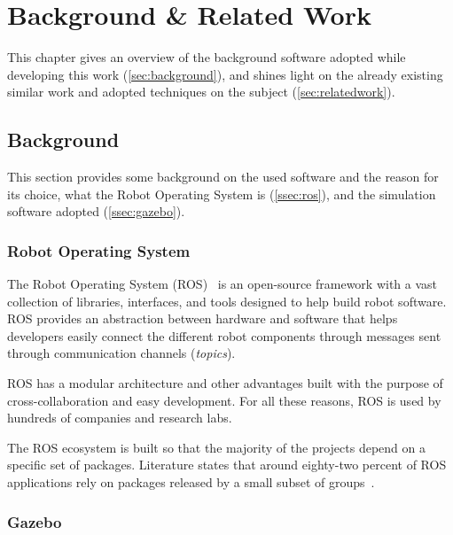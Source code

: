 \chapter{Background \& Related Work}
\label{chap:background}

This chapter gives an overview of the background software adopted while developing this work (\autoref{sec:background}), and shines light on the already existing similar work and adopted techniques on the subject (\autoref{sec:relatedwork}).


\section{Background}
\label{sec:background}

This section provides some background on the used software and the reason for its choice, what the Robot Operating System is (\autoref{ssec:ros}), and the simulation software adopted (\autoref{ssec:gazebo}).


\subsection{Robot Operating System}
\label{ssec:ros}

The Robot Operating System (ROS)~\cite{quigley2009ros} is an open-source framework with a vast collection of libraries, interfaces, and tools designed to help build robot software. ROS provides an abstraction between hardware and software that helps developers easily connect the different robot components through messages sent through communication channels (\textit{topics}).

ROS has a modular architecture and other advantages built with the purpose of cross-collaboration and easy development. For all these reasons, ROS is used by hundreds of companies and research labs.

The ROS ecosystem is built so that the majority of the projects depend on a specific set of packages. Literature states that around eighty-two percent of ROS applications rely on packages released by a small subset of groups~\cite{9240632}.


\subsection{Gazebo}
\label{ssec:gazebo}

